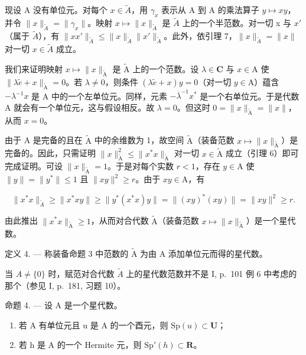 现设 A 没有单位元。对每个 \(x \in \widetilde{A}\)，用 \(\gamma_{x}\) 表示从 A 到 A 的乘法算子 \(y \mapsto xy\)，并令 \(\|x\|_{\widetilde{A}} = \| \gamma_{x}\|\)。映射 \(x \mapsto \|x\|_{\widetilde{A}}\) 是 \(\widetilde{A}\) 上的一个半范数。对一切 x 与 \(x'\)（属于 \(\widetilde{A}\)），有 \(\|xx'\|_{\widetilde{A}} \leqslant \|x\|_{\widetilde{A}} \|x'\|_{\widetilde{A}}\)。此外，依引理 7，\(\|x\|_{\widetilde{A}} = \|x\|\) 对一切 \(x \in \widetilde{A}\) 成立。

我们来证明映射 \(x \mapsto \|x\|_{\widetilde{\mathrm{A}}}\) 是 \(\widetilde{\mathrm{A}}\) 上的一个范数。设 \(\lambda \in \mathbf{C}\) 与 \(x \in \mathrm{A}\) 使 \(\| \lambda \widetilde{e} + x\|_{\widetilde{\mathrm{A}}} = 0\)。若 \(\lambda \neq 0\)，则条件 \((\lambda \widetilde{e} + x)y = 0\)（对一切 \(y \in \mathrm{A}\)）蕴含 \(-\lambda^{-1}x\) 是 A 中的一个左单位元。同样，元素 \(-\overline{\lambda}^{-1}x^{*}\) 是一个右单位元。于是代数 A 就会有一个单位元，这与假设相反。故 \(\lambda = 0\)。但这时 \(0 = \|x\|_{\widetilde{\mathrm{A}}} = \|x\|\)，从而 \(x = 0\)。

由于 A 是完备的且在 \(\widetilde{\mathrm{A}}\) 中的余维数为 1，故空间 \(\widetilde{\mathrm{A}}\)（装备范数 \(x \mapsto \|x\|_{\widetilde{\mathrm{A}}}\)）是完备的。因此，只需证明 \(\|x\|_{\widetilde{\mathrm{A}}}^{2} \leqslant \|x^{*}x\|_{\widetilde{\mathrm{A}}}\) 对一切 \(x \in \widetilde{\mathrm{A}}\) 成立（引理 6）即可完成证明。可设 \(\|x\|_{\widetilde{\mathrm{A}}} = 1\)。于是对每个实数 \(r < 1\)，存在 \(y \in \mathrm{A}\) 使 \(\|y\| = \|y^{*}\| \leqslant 1\) 且 \(\|xy\|^2 \geqslant r\)。由于 \(xy \in \mathrm{A}\)，有

\[
\| x ^ {*} x \| _ {\widetilde {A}} \geqslant \| x ^ {*} x y \| \geqslant \| y ^ {*} (x ^ {*} x) y \| = \| (x y) ^ {*} (x y) \| = \| x y \| ^ {2} \geqslant r.
\]

由此推出 \(\| x^{*}x\|_{\widetilde{\mathrm{A}}}\geqslant 1\)，从而对合代数 \(\widetilde{\mathrm{A}}\)（装备范数 \(x\mapsto \| x\|_{\widetilde{\mathrm{A}}}\)）是一个星代数。

定义 4. --- 称装备命题 3 中范数的 \(\widetilde{\mathrm{A}}\) 为由 A 添加单位元而得的星代数。

当 \(A \neq \{0\}\) 时，赋范对合代数 \(\widetilde{A}\) 上的星代数范数并不是 I, p.~101 例 6 中考虑的那个（参见 I, p.~181, 习题 10）。

命题 4. --- 设 A 是一个星代数。

\begin{enumerate}
\def\labelenumi{\alph{enumi})}
\item
  若 A 有单位元且 u 是 A 的一个酉元，则 \(\mathrm{Sp}(u) \subset \mathbf{U}\)；
\item
  若 h 是 A 的一个 Hermite 元，则 \(\mathrm{Sp}'(h) \subset \mathbf{R}\)。
\end{enumerate}

